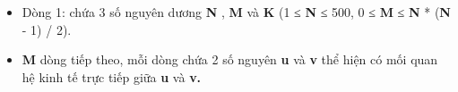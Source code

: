 \begin{itemize}
	\item Dòng 1: chứa 3 số nguyên dương \textbf{N} , \textbf{M }và \textbf{K} (1 ≤ \textbf{N} ≤ 500, 0 ≤ \textbf{M} ≤ \textbf{N} * (\textbf{N} - 1) / 2).
\end{itemize}
\begin{itemize}
	\item \textbf{M} dòng tiếp theo, mỗi dòng chứa 2 số nguyên \textbf{u} và \textbf{v} thể hiện có mối quan hệ kinh tế trực tiếp giữa \textbf{u} và \textbf{v}\textbf{.}
\end{itemize}